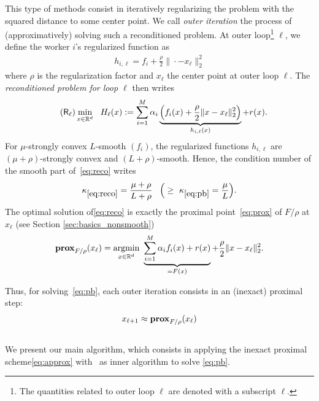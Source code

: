 This type of methods consist in iteratively regularizing the problem with the squared distance to some center point. We call \emph{outer iteration} the process of (approximatively) solving such a reconditioned problem. At outer loop\footnote{The quantities related to outer loop $\ell$ are denoted with a subscript $\ell$.} $\ell$, we define the worker $i$'s regularized function as 
\begin{align*}
    h_{i,\ell} =  f_i + \frac{\rho}{2} \| \cdot - x_\ell \|_2^2 
\end{align*}
where $\rho$ is the regularization factor and $x_\ell$ the center point at outer loop $\ell$. The \emph{reconditioned problem for loop $\ell$} then writes
\begin{align}\label{eq:reco}
\tag{$\mathsf{R}_\ell$}
& \min_{x\in\mathbb{R}^d}  ~~ H_\ell(x)  :=  \sum_{i=1}^M  \alpha_i \underbrace{\left( f_i(x) + \frac{\rho}{2} \| x - x_\ell \|_2^2 \right)}_{h_{i,\ell}(x)}  +  r(x) .
\end{align}
For $\mu$-strongly convex $L$-smooth $(f_i)$, the regularized functions $h_{i,\ell}$ are $(\mu+\rho)$-strongly convex and $(L+\rho)$-smooth. Hence, the condition number of the smooth part of~\eqref{eq:reco} writes
\begin{align*}
   \kappa_{\eqref{eq:reco}} = \frac{\mu + \rho}{L+\rho}\, ~~\Big(\geq~\kappa_{\eqref{eq:pb}} = \frac{\mu}{L}\Big).
\end{align*}
The optimal solution of\;\eqref{eq:reco} is exactly the proximal point~\eqref{eq:prox} of $F/\rho$ at $x_\ell$ (see Section \ref{sec:basics_nonsmooth})
\begin{align*}
\mathbf{prox}_{F/\rho} (x_\ell) = \operatorname*{argmin}_{x\in\mathbb{R}^d}  ~ \underbrace{  \sum_{i=1}^M \alpha_i f_i(x) +  r(x)}_{= F(x)} +  \frac{\rho}{2} \| x- x_\ell \|_2^2.
\end{align*}

Thus, for solving~\eqref{eq:pb}, each outer iteration consists in an (inexact) proximal step:
\begin{align}
\label{eq:approx}
    x_{\ell+1} \approx \mathbf{prox}_{F/\rho} (x_\ell) 
\end{align}

\subsection{\recoalgo}\label{sec:recoalgo}

We present our main algorithm, which consists in applying the inexact proximal scheme\;\eqref{eq:approx} with \spyI~as inner algorithm to solve \eqref{eq:pb}. 


